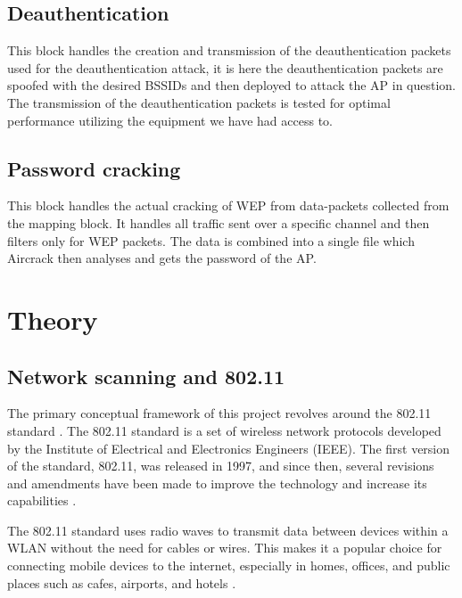 \subsection{Deauthentication}
This block handles the creation and transmission of the deauthentication packets used for the deauthentication attack, it is here the deauthentication packets are spoofed with the desired BSSIDs and then deployed to attack the AP in question. The transmission of the deauthentication packets is tested for optimal performance utilizing the equipment we have had access to. 

\subsection{Password cracking}
This block handles the actual cracking of WEP from data-packets collected from the mapping block. It handles all traffic sent over a specific channel and then filters only for WEP packets. The data is combined into a single file which Aircrack then analyses and gets the password of the AP.

\section{Theory}

\subsection{Network scanning and 802.11}
The primary conceptual framework of this project revolves around the 802.11 standard \cite{IEEE802.11}. The 802.11 standard is a set of wireless network protocols developed by the Institute of Electrical and Electronics Engineers (IEEE). The first version of the standard, 802.11, was released in 1997, and since then, several revisions and amendments have been made to improve the technology and increase its capabilities \cite{ETHW}.

The 802.11 standard uses radio waves to transmit data between devices within a WLAN without the need for cables or wires. This makes it a popular choice for connecting mobile devices to the internet, especially in homes, offices, and public places such as cafes, airports, and hotels \cite{Public_WiFi}.

